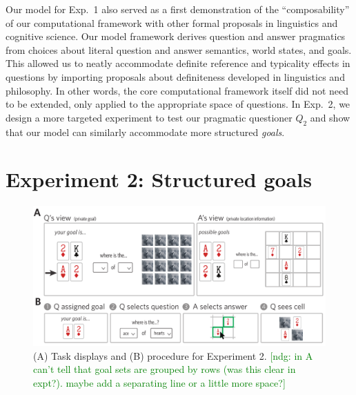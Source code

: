 \documentclass[11pt, floatsintext]{apa6}
\newcommand{\ndg}[1]{\textcolor{Green}{[ndg: #1]}}
\begin{document}
Our model for Exp.~1 also served as a first demonstration of the ``composability'' of our computational framework with other formal proposals in linguistics and cognitive science.
Our model framework derives question and answer pragmatics from choices about literal question and answer semantics, world states, and goals. This allowed us to neatly accommodate definite reference and typicality effects in questions by importing proposals about definiteness developed in linguistics and philosophy.
In other words, the core computational framework itself did not need to be extended, only applied to the appropriate space of questions. 
In Exp.~2, we design a more targeted experiment to test our pragmatic questioner $Q_2$ and show that our model can similarly accommodate more structured \emph{goals}.

\section{Experiment 2: Structured goals}
\begin{figure}[th!]
\begin{center}
\includegraphics[scale = .9]{Exp2/task.pdf}
\end{center}
\caption{(A) Task displays and (B) procedure for Experiment 2. \ndg{in A can't tell that goal sets are grouped by rows (was this clear in expt?). maybe add a separating line or a little more space?}}
\label{fig:exp2task}
\end{figure}
\end{document}
